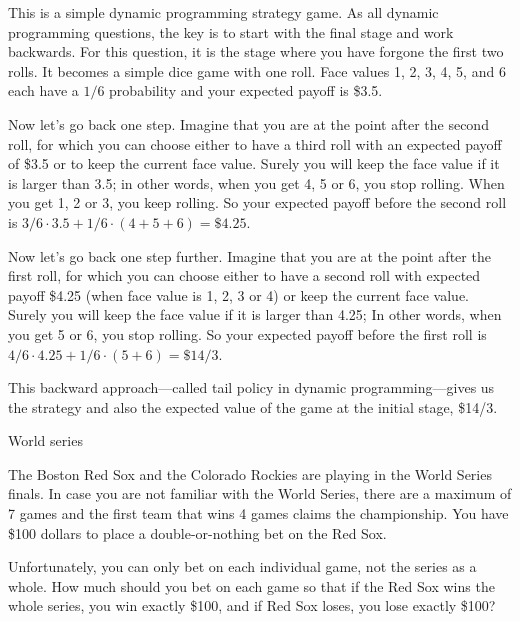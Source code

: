 \begin{solution}
This is a simple dynamic programming strategy game. As all dynamic programming
questions, the key is to start with the final stage and work backwards. For this
question, it is the stage where you have forgone the first two rolls. It becomes a
simple dice game with one roll. Face values 1, 2, 3, 4, 5, and 6 each have a $1/6$
probability and your expected payoff is \$3.5.

Now let's go back one step. Imagine that you are at the point after the second roll,
for which you can choose either to have a third roll with an expected payoff of
\$3.5 or to keep the current face value. Surely you will keep the face value if it
is larger than 3.5; in other words, when you get 4, 5 or 6, you stop rolling. When
you get 1, 2 or 3, you keep rolling. So your expected payoff before the second roll
is $3/6\cdot3.5+1/6\cdot(4+5+6)=\$4.25$.

Now let's go back one step further. Imagine that you are at the point after the first
roll, for which you can choose either to have a second roll with expected payoff
\$4.25 (when face value is 1, 2, 3 or 4) or keep the current face value. Surely you
will keep the face value if it is larger than 4.25; In other words, when you get 5
or 6, you stop rolling. So your expected payoff before the first roll is
$4/6\cdot4.25+1/6\cdot(5+6)=\$14/3$.

This backward approach---called tail policy in dynamic programming---gives us the
strategy and also the expected value of the game at the initial stage, \$14/3.

\end{solution}

\begin{problem}{World series}

The Boston Red Sox and the Colorado Rockies are playing in the World Series finals.
In case you are not familiar with the World Series, there are a maximum of 7 games
and the first team that wins 4 games claims the championship. You have \$100 dollars
to place a double-or-nothing bet on the Red Sox.

Unfortunately, you can only bet on each individual game, not the series as a whole.
How much should you bet on each game so that if the Red Sox wins the whole series,
you win exactly \$100, and if Red Sox loses, you lose exactly \$100?
\end{problem}

